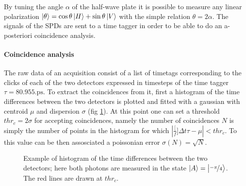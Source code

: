 \documentclass[a4paper, 11pt]{article}
\begin{document}
  By tuning the angle $\alpha$ of the half-wave plate it is possible to measure any linear polarization $\ket{\theta} = \cos{\theta}\ket{H} + \sin{\theta}\ket{V}$ with the simple relation $\theta = 2\alpha$.
  The signals of the SPDs are sent to a time tagger in order to be able to do an a-posteriori coincidence analysis.

  \paragraph{Coincidence analysis}
  The raw data of an acquisition consist of a list of timetags corresponding to the clicks of each of the two detectors expressed in timesteps of the time tagger $\tau = 80.955\si{.\pico\second}$. To extract the coincidences from it, first a histogram of the time differences between the two detectors is plotted and fitted with a gaussian with centroid $\mu$ and dispersion $\sigma$ (fig \ref{fig:hist}). At this point one can set a threshold $thr_{c} = 2\sigma$ for accepting coincidences, namely the number of coincidences $N$ is simply the number of points in the histogram for which $|\frac[f]{\Delta t}{\tau} - \mu| < thr_{c}$. To this value can be then assosciated a poissonian error $\sigma(N) = \sqrt{N}$.

  \begin{figure}[H]
    \centering
    \caption{Example of histogram of the time differences between the two detectors; here both photons are measured in the state $\ket{A} = \ket{\frac[f]{-\pi}{4}}$. The red lines are drawn at $thr_c$.}
    \label{fig:hist}
  \end{figure}
\end{document}
